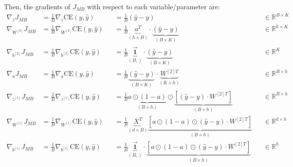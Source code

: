 \begin{answer}
Then, the gradients of $J_{MB}$ with respect to each variable/parameter are:
\begin{align*}
    \nabla_{z} J_{MB} &= \frac{1}{B} \nabla_{z} \mathrm{CE}(y, \hat{y}) &&= \frac{1}{B} \left( \hat{y} - y \right) & &\in \mathbb{R}^{B \times K}\\
    \nabla_{W^{[2]}} J_{MB} &= \frac{1}{B} \nabla_{W^{[2]}} \mathrm{CE}(y, \hat{y}) &&= 
    \frac{1}{B} \underbrace{a^T}_{(h \times B)}  \cdot \underbrace{\left( \hat{y} - y \right)}_{(B \times K)} & &\in \mathbb{R}^{h \times K}\\
    \nabla_{b^{[2]}} J_{MB} &= \frac{1}{B} \nabla_{b^{[2]}} \mathrm{CE}(y, \hat{y}) &&= 
    \frac{1}{B} \underbrace{\vec{\mathbf{1}}}_{(B,)} \cdot \underbrace{\left( \hat{y} - y \right)}_{(B \times K)} & &\in \mathbb{R}^{K}\\
    \nabla_{a} J_{MB} &= \frac{1}{B} \nabla_{a} \mathrm{CE}(y, \hat{y}) &&= 
    \frac{1}{B} \underbrace{\left( \hat{y} - y \right)}_{(B \times K)} \cdot \underbrace{W^{[2]T}}_{(K \times h)} & &\in \mathbb{R}^{B \times h}\\
    \nabla_{z^{[1]}} J_{MB} &= \frac{1}{B} \nabla_{z^{[1]}} \mathrm{CE}(y, \hat{y}) &&= 
    \frac{1}{B} \underbrace{a \odot (1-a)}_{(B \times h)} \odot
    \underbrace{ \left[ \left( \hat{y} - y \right) \cdot W^{[2]T} \right]}_{(B \times h)}
    & &\in \mathbb{R}^{B \times h}\\
    \nabla_{W^{[1]}} J_{MB} &= \frac{1}{B} \nabla_{W^{[1]}} \mathrm{CE}(y, \hat{y}) &&= 
    \frac{1}{B} \underbrace{X^T}_{(d \times B)} \underbrace{ \left[ a \odot (1-a) \odot
    \left( \hat{y} - y \right) \cdot W^{[2]T} \right]}_{(B \times h)} & &\in \mathbb{R}^{d \times h}\\
    \nabla_{b^{[1]}} J_{MB} &= \frac{1}{B} \nabla_{b^{[1]}} \mathrm{CE}(y, \hat{y}) &&= 
    \frac{1}{B} \underbrace{\vec{\mathbf{1}}}_{(B,)} \cdot \underbrace{ \left[ a \odot (1-a) \odot
    \left( \hat{y} - y \right) \cdot W^{[2]T} \right]}_{(B \times h)} & &\in \mathbb{R}^{h}
\end{align*}

\end{answer}
   
  
